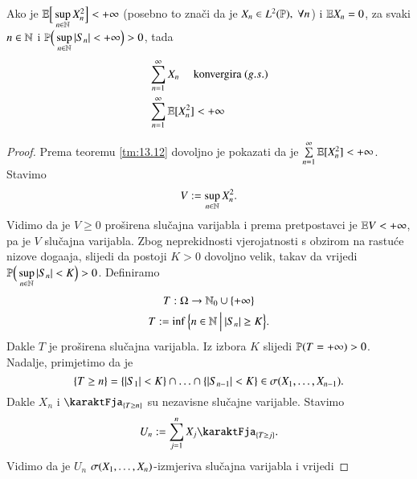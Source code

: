 \begin{prop}    \label{prop:13.13}
    Ako je $\mathbb{E} \Big[ \sup\limits_{n \in \mathbb{N}} X_n^2 \Big] < + \infty$ (posebno to zna\v ci da je $X_n \in L^2 (\mathbb{P}), \; \forall n$) i $\mathbb{E} X_n = 0$, za svaki $n \in \mathbb{N}$ i $\mathbb{P} \Big( \sup\limits_{n \in \mathbb{N}} |S_n| < + \infty \Big) > 0$, tada
    \begin{equation*}
        \begin{aligned}
            & \sum\limits_{n = 1}^{\infty} X_n \quad \textnormal{ konvergira } (g.s.)\\
            & \sum\limits_{n = 1}^{\infty} \mathbb{E} [ X_n^2 ] < + \infty
        \end{aligned}
    \end{equation*}
\end{prop}

\begin{proof}
    Prema teoremu \ref{tm:13.12} dovoljno je pokazati da je $\sum\limits_{n = 1}^{\infty} \mathbb{E} [ X_n^2 ] < +\infty$.
    Stavimo
    \begin{equation*}
        V := \sup\limits_{n \in \mathbb{N}} X_n^2.
    \end{equation*}
    Vidimo da je $V \geq 0$ pro\v sirena slu\v cajna varijabla i prema pretpostavci je $\mathbb{E} V < +\infty$, pa je $V$ slu\v cajna varijabla.
    Zbog neprekidnosti vjerojatnosti s obzirom na rastu\' ce nizove doga\dj aja, slijedi da postoji $K > 0$ dovoljno velik, takav da vrijedi $\mathbb{P} \Big( \sup\limits_{n \in \mathbb{N}} |S_n| < K \Big) > 0$.
    Definiramo
    \begin{equation*}
        \begin{gathered}
            T: \Omega \to \mathbb{N}_0 \cup \{+\infty\}\\
            T:= \inf \Big\{ {n \in \mathbb{N}} \: \Big| \: {|S_n| \geq K} \Big\}.
        \end{gathered}
    \end{equation*}
    Dakle $T$ je pro\v sirena slu\v cajna varijabla.
    Iz izbora $K$ slijedi $\mathbb{P} (T = +\infty) > 0$.
    Nadalje, primjetimo da je
    \begin{equation*}
        \{T \geq n\} = \{ |S_1| < K \} \cap \ldots \cap \{|S_{n-1}| < K\} \in \sigma({X_1, \ldots, X_{n-1}}).
    \end{equation*}
    Dakle $X_n$ i $\karaktFja_{\{T \geq n\}}$ su nezavisne slu\v cajne varijable.
    Stavimo
    \begin{equation*}
        U_n := \suma{j = 1}{n} X_j \karaktFja_{\{T \geq j\}}.
    \end{equation*}
    Vidimo da je $U_n$ $\sigma({X_1, \ldots, X_n})$-izmjeriva slu\v cajna varijabla i vrijedi

\end{proof}
